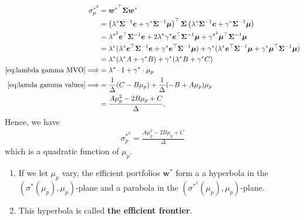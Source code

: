 \documentclass[13pt]{article}
\theoremstyle{definition}
\theoremstyle{remark}
\newenvironment{remark}
  {\pushQED{\qed}\renewcommand{\qedsymbol}{$\triangle$}\remarkx}
  {\popQED\endremarkx}
\begin{document}
$$
\begin{aligned}
\sigma_{p}^{*^2} & =\bm{w}^{*^\top} \mathbf{\Sigma} \bm{w}^{*} \\
& =\left(\lambda^{*} \mathbf{\Sigma}^{-1} \bm{e}+\gamma^{*} \mathbf{\Sigma}^{-1} \bm{\mu}\right)^{\top} \mathbf{\Sigma}\left(\lambda^{*} \mathbf{\Sigma}^{-1} \bm{e}+\gamma^{*} \mathbf{\Sigma}^{-1} \bm{\mu}\right) \\
&=\lambda^{*^2}\bm{e}^{\top}\mathbf{\Sigma}^{-1}\bm{e}+2\lambda^{*}\gamma^{*}\bm{e}^{\top}\mathbf{\Sigma}^{-1}\bm{\mu}+\gamma^{*^2}\bm{\mu}^{\top}\mathbf{\Sigma}^{-1}\bm{\mu}\\
&=\lambda^{*}(\lambda^{*}\bm{e}^{\top}\mathbf{\Sigma}^{-1}\bm{e}+\gamma^{*}\bm{e}^{\top}\mathbf{\Sigma}^{-1}\bm{\mu})+\gamma^{*}(\lambda^{*}\bm{e}^{\top}\mathbf{\Sigma}^{-1}\bm{\mu}+\gamma^{*}\bm{\mu}^{\top}\mathbf{\Sigma}^{-1}\bm{\mu})\\
&=\lambda^{*}(\lambda^{*}A+\gamma^{*}B)+\gamma^{*}(\lambda^{*}B+\gamma^{*}C)\\
\cref{eq:lambda gamma MVO}\Longrightarrow &=\lambda^{*}\cdot 1+\gamma^{*}\cdot \mu_p\\
\cref{eq:lamda gamma values} \Longrightarrow&=\frac{1}{\Delta}(C-B\mu_p)+\frac{1}{\Delta}(-B+A\mu_p)\mu_p\\
& =\frac{A \mu_{p}^{2}-2 B \mu_{p}+C}{\Delta},
\end{aligned}
$$
Hence, we have
\begin{align}
    \sigma_{p}^{*^2}=\frac{A \mu_{p}^{2}-2 B \mu_{p}+C}{\Delta}
\end{align}
which is a quadratic function of $\mu_{p}$. 
\begin{remark}\hfill
    \begin{enumerate}
        \item If we let $\mu_{p}$ vary, the efficient portfolios $\bm{w}^{*}$ form a {\color{C6}a hyperbola in the $\left(\sigma^{*}\left(\mu_p\right), \mu_p\right)$-plane} and {\color{C6}a parabola in the $\left(\sigma^{*^2}\left(\mu_p\right), \mu_p\right)$-plane}. 
        \item This hyperbola is called \textbf{the efficient frontier}.
    \end{enumerate}
\end{remark}
\end{document}
